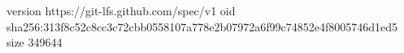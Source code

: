 version https://git-lfs.github.com/spec/v1
oid sha256:313f8c52c8cc3c72cbb0558107a778e2b07972a6f99c74852e4f8005746d1ed5
size 349644
